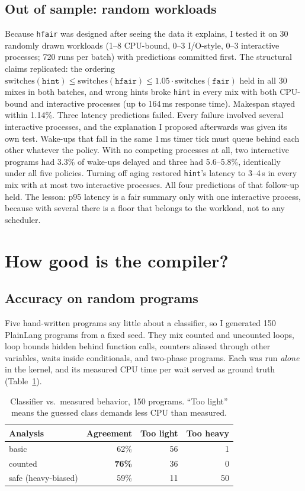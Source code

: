 \documentclass[10pt,twocolumn]{article}
\newcommand{\us}{\,\textmu s}
\newcommand{\ms}{\,ms}
\newcommand{\pol}[1]{\texttt{#1}}
\begin{document}
\subsection{Out of sample: random workloads}
Because \pol{hfair} was designed after seeing the data it explains, I tested it on 30
randomly drawn workloads (1--8 CPU-bound, 0--3 I/O-style, 0--3 interactive processes; 720
runs per batch) with predictions committed first. The structural claims replicated: the
ordering $\text{switches}(\pol{hint}) \le \text{switches}(\pol{hfair}) \le
1.05\cdot\text{switches}(\pol{fair})$ held in all 30 mixes in both batches, and wrong hints
broke \pol{hint} in every mix with both CPU-bound and interactive processes (up to 164\ms{}
response time). Makespan stayed within 1.14\%. Three latency predictions failed. Every
failure involved several interactive processes, and the explanation I proposed afterwards
was given its own test. Wake-ups that fall in the same 1\ms{} timer tick must queue behind
each other whatever the policy. With no competing processes at all, two interactive
programs had 3.3\% of wake-ups delayed and three had 5.6--5.8\%, identically under all five
policies. Turning off aging restored \pol{hint}'s latency to 3--4\us{} in every mix with at
most two interactive processes. All four predictions of that follow-up held. The lesson:
p95 latency is a fair summary only with one interactive process, because with several there
is a floor that belongs to the workload, not to any scheduler.

\section{How good is the compiler?}\label{sec:compiler}

\subsection{Accuracy on random programs}
Five hand-written programs say little about a classifier, so I generated 150 PlainLang
programs from a fixed seed. They mix counted and uncounted loops, loop bounds hidden behind
function calls, counters aliased through other variables, waits inside conditionals, and
two-phase programs. Each was run \emph{alone} in the kernel, and its measured CPU time per
wait served as ground truth (Table~\ref{tab:acc}).

\begin{table}[t]
\centering\small
\begin{tabular}{@{}lrrr@{}}
\toprule
Analysis & Agreement & Too light & Too heavy \\ \midrule
basic & 62\% & 56 & 1 \\
counted & \textbf{76\%} & 36 & 0 \\
safe (heavy-biased) & 59\% & 11 & 50 \\ \bottomrule
\end{tabular}
\caption{Classifier vs.\ measured behavior, 150 programs. ``Too light'' means the guessed
class demands less CPU than measured.}\label{tab:acc}
\end{table}
\end{document}
